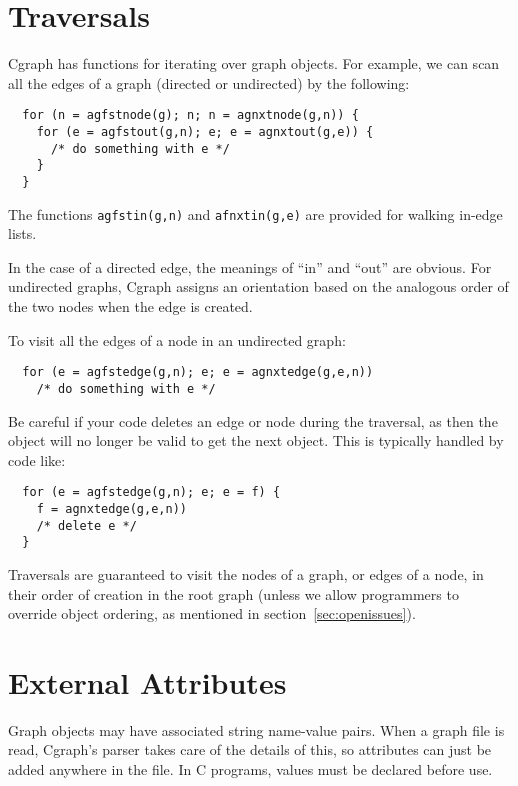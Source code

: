 \documentclass[11pt,letterpaper]{article}
\begin{document}
\section{Traversals}
\label{sec:traversals}

Cgraph has functions for iterating over graph objects.
For example, we can scan all the edges of a graph (directed
or undirected) by the following:

\begin{verbatim}
  for (n = agfstnode(g); n; n = agnxtnode(g,n)) {
    for (e = agfstout(g,n); e; e = agnxtout(g,e)) {
      /* do something with e */
    }
  }
\end{verbatim}
\label{traversal}

The functions \verb"agfstin(g,n)" and \verb"afnxtin(g,e)" are
provided for walking in-edge lists.

In the case of a directed edge, the meanings of ``in'' and ``out'' are 
obvious.  For undirected graphs, Cgraph assigns an 
orientation based on the analogous order of the two nodes when the edge
is created.

To visit all the edges of a node in an undirected graph:

\begin{verbatim}
  for (e = agfstedge(g,n); e; e = agnxtedge(g,e,n))
    /* do something with e */
\end{verbatim}

Be careful if your code deletes an edge or node during the traversal, as
then the object will no longer be valid to get the next object. 
This is typically handled by code like:
\begin{verbatim}
  for (e = agfstedge(g,n); e; e = f) { 
    f = agnxtedge(g,e,n))
    /* delete e */
  }
\end{verbatim}

Traversals are guaranteed to visit the nodes of a graph, or edges of a node,
in their order of creation in the root graph (unless we allow programmers
to override object ordering, as mentioned in section~\ref{sec:openissues}).

\section{External Attributes}
\label{sec:externalattributes}

Graph objects may have associated string name-value pairs.  
When a graph file is read, Cgraph's parser takes care of 
the details of this, so attributes can just be added
anywhere in the file.  In C programs, values must be
declared before use.
\end{document}
